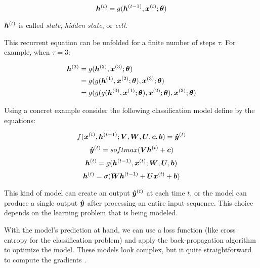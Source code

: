 \begin{equation}
\bm{h}^{(t)} = g(\bm{h}^{(t-1)}, \bm{x}^{(t)}; \bm{\theta})
\end{equation}

$\bm{h}^{(t)}$ is called \textit{state}, \textit{hidden state}, or \textit{cell}.


\par This recurrent equation can be unfolded for a finite number of steps $\tau$. For example, when $\tau =3$:
\vspace{0.2cm}

\begin{align}
\bm{h}^{(3)}& = g(\bm{h}^{(2)}, \bm{x}^{(3)}; \bm{\theta})\\
 & = g(g(\bm{h}^{(1)}, \bm{x}^{(2)}; \bm{\theta}), \bm{x}^{(3)}; \bm{\theta})\\
 & = g(g(g(\bm{h}^{(0)}, \bm{x}^{(1)}; \bm{\theta}), \bm{x}^{(2)}; \bm{\theta}), \bm{x}^{(3)}; \bm{\theta})\\
\end{align}

Using a concret example consider the following classification model define by the equations:

\begin{equation}
f(\bm{x}^{(t)}, \bm{h}^{(t-1)}; \bm{V}, \bm{W}, \bm{U}, \bm{c}, \bm{b}) = \bm{\hat{y}}^{(t)}
\end{equation}
 \vspace{0.2cm}
\begin{equation}
\bm{\hat{y}}^{(t)} = softmax(\bm{V} \bm{h}^{(t)} + \bm{c})
\end{equation}
\vspace{0.2cm}
 \begin{equation}
\bm{h}^{(t)} = g(\bm{h}^{(t-1)}, \bm{x}^{(t)}; \bm{W},\bm{U}, \bm{b})
\end{equation}
\vspace{0.2cm}
\begin{equation}
\bm{h}^{(t)} = \sigma(\bm{W} \bm{h}^{(t-1)} + \bm{U} \bm{x}^{(t)} + \bm{b})
\end{equation}

This kind of model can create an output $\bm{\hat{y}}^{(t)}$ at each time $t$, or the model can produce a single output $\bm{\hat{y}}$ after processing an entire input sequence. This choice depends on the learning problem that is being modeled.

With the model's prediction at hand, we can use a loss function (like cross entropy for the classification problem) and apply the back-propagation algorithm to optimize the model. These models look complex, but it quite straightforward to compute the gradients \cite[p.~374]{DeepLearningbook}.

